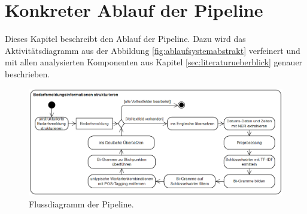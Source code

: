\section{Konkreter Ablauf der Pipeline}
Dieses Kapitel beschreibt den Ablauf der Pipeline. Dazu wird das Aktivitätsdiagramm aus der Abbildung \ref{fig:ablaufsystemabstrakt} verfeinert und mit allen analysierten Komponenten aus Kapitel \ref{sec:literaturueberblick} genauer beschrieben.
\begin{figure}[H]
	\centering  
	\includegraphics[width=\linewidth]{Abbildungen/flowchart.png}
	\caption{Flussdiagramm der Pipeline.}
	\label{fig:flowchart}
\end{figure}\mbox{} \\
